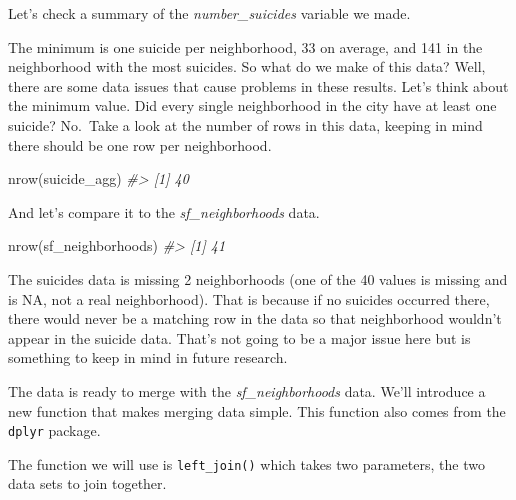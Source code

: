 \documentclass[
]{krantz}
\makeatletter
\newenvironment{Shaded}{\begin{snugshade}}{\end{snugshade}}
\newcommand{\CommentTok}[1]{\textcolor[rgb]{0.37,0.37,0.37}{\textit{#1}}}
\newcommand{\FunctionTok}[1]{\textcolor[rgb]{0,0,0}{#1}}
\newcommand{\NormalTok}[1]{#1}
\newcommand{\SpecialCharTok}[1]{\textcolor[rgb]{0,0,0}{#1}}
\newenvironment{kframe}{%
\medskip{}
\setlength{\fboxsep}{.8em}
 \def\at@end@of@kframe{}%
 \ifinner\ifhmode%
  \def\at@end@of@kframe{\end{minipage}}%
  \begin{minipage}{\columnwidth}%
 \fi\fi%
 \def\FrameCommand##1{\hskip\@totalleftmargin \hskip-\fboxsep
 \colorbox{shadecolor}{##1}\hskip-\fboxsep
     \hskip-\linewidth \hskip-\@totalleftmargin \hskip\columnwidth}%
 \MakeFramed {\advance\hsize-\width
   \@totalleftmargin\z@ \linewidth\hsize
   \@setminipage}}%
 {\par\unskip\endMakeFramed%
 \at@end@of@kframe}
\renewenvironment{Shaded}{\begin{kframe}}{\end{kframe}}
\makeatother
\begin{document}
Let's check a summary of the \emph{number\_suicides} variable we made.

\begin{Shaded}
\end{Shaded}

The minimum is one suicide per neighborhood, 33 on average, and 141 in the neighborhood with the most suicides. So what do we make of this data? Well, there are some data issues that cause problems in these results. Let's think about the minimum value. Did every single neighborhood in the city have at least one suicide? No.~Take a look at the number of rows in this data, keeping in mind there should be one row per neighborhood.

\begin{Shaded}
\begin{Highlighting}[]
\FunctionTok{nrow}\NormalTok{(suicide\_agg)}
\CommentTok{\#\textgreater{} [1] 40}
\end{Highlighting}
\end{Shaded}

And let's compare it to the \emph{sf\_neighborhoods} data.

\begin{Shaded}
\begin{Highlighting}[]
\FunctionTok{nrow}\NormalTok{(sf\_neighborhoods)}
\CommentTok{\#\textgreater{} [1] 41}
\end{Highlighting}
\end{Shaded}

The suicides data is missing 2 neighborhoods (one of the 40 values is missing and is NA, not a real neighborhood). That is because if no suicides occurred there, there would never be a matching row in the data so that neighborhood wouldn't appear in the suicide data. That's not going to be a major issue here but is something to keep in mind in future research.

The data is ready to merge with the \emph{sf\_neighborhoods} data. We'll introduce a new function that makes merging data simple. This function also comes from the \texttt{dplyr} package.

The function we will use is \texttt{left\_join()} which takes two parameters, the two data sets to join together.
\end{document}
